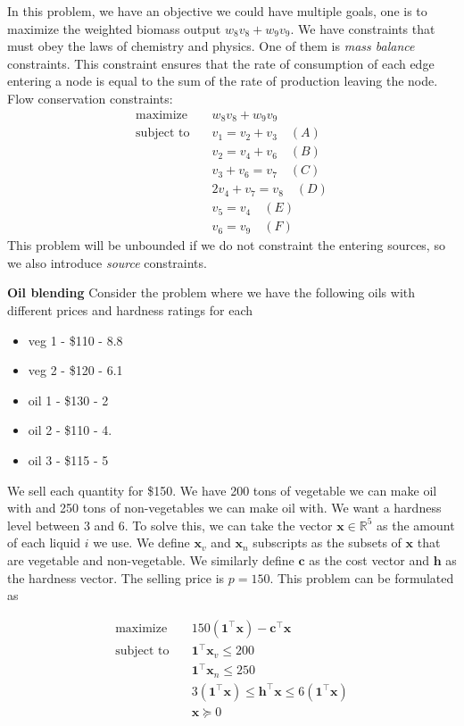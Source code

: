 In this problem, we have an objective we could have multiple goals, one is to maximize the weighted biomass output $w_8 v_8 + w_9 v_9$.
We have constraints that must obey the laws of chemistry and physics. One of them is \textit{mass balance} constraints.
This constraint ensures that the rate of consumption of each edge entering a node is equal to the sum of the rate of production leaving the node.
Flow conservation constraints:
\begin{align}
  \text{maximize} & \quad w_8 v_8 + w_9 v_9 \\
  \text{subject to} & \quad v_1 = v_2 + v_3 \quad (A)\\
  & \quad v_2 = v_4 + v_6 \quad (B)\\
  & \quad v_3 + v_6 = v_7 \quad (C)\\
  & \quad 2v_4 + v_7 = v_8 \quad (D)\\
  & \quad v_5 = v_4 \quad (E)\\
  & \quad v_6 = v_9 \quad (F)
\end{align} 
This problem will be unbounded if we do not constraint the entering sources, so we also introduce \textit{source} constraints.

\textbf{Oil blending}
Consider the problem where we have the following oils with different prices and hardness ratings for each
\begin{itemize}
    \item veg 1 - \$110 - 8.8
    \item veg 2 - \$120 - 6.1
    \item oil 1 - \$130 - 2
    \item oil 2 - \$110 - 4.
    \item oil 3 - \$115 - 5
\end{itemize}
We sell each quantity for \$150.
We have 200 tons of vegetable we can make oil with and 250 tons of non-vegetables we can make oil with.
We want a hardness level between 3 and 6.
To solve this, we can take the vector $\textbf{x} \in \mathbb{R}^5$ as the amount of each liquid $i$ we use. 
We define $\textbf{x}_v$ and $\textbf{x}_n$ subscripts as the subsets of $\textbf{x}$ that are vegetable and non-vegetable.
We similarly define $\textbf{c}$ as the cost vector and $\textbf{h}$ as the hardness vector.
The selling price is $p=150$.
This problem can be formulated as

\begin{align}
  \text{maximize} & \quad 150 (\textbf{1}^\top \textbf{x}) - \textbf{c}^\top \textbf{x} \\
  \text{subject to} & \quad \textbf{1}^\top \textbf{x}_v \leq 200\\
  & \quad \textbf{1}^\top \textbf{x}_n \leq 250 \\
  & \quad 3 (\textbf{1}^\top \textbf{x}) \leq \textbf{h}^\top \textbf{x} \leq 6 (\textbf{1}^\top \textbf{x}) \\
  & \quad \textbf{x} \succeq 0
\end{align}


